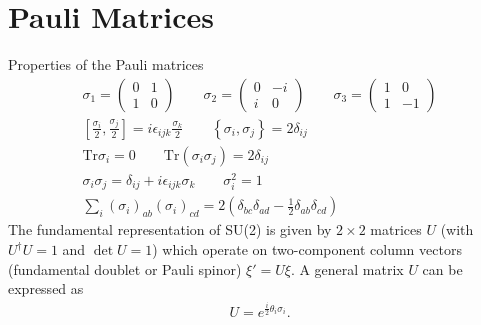 \documentclass[10pt,a4paper]{book}
\theoremstyle{definition}
\begin{document}
\section{Pauli Matrices}
Properties of the Pauli matrices
\begin{align}
\sigma_1=\left(
\begin{matrix}
0    & 1\\
1 &  0
\end{matrix}
\right)\qquad
\sigma_2=\left(
\begin{matrix}
0    & -i\\
i &  0
\end{matrix}
\right)\qquad
\sigma_3=
\left(
\begin{matrix}
1 & 0\\
1 &  -1
\end{matrix}
\right)\\
%
\left[\frac{\sigma_i}{2},\frac{\sigma_j}{2}\right]=i\epsilon_{ijk}\frac{\sigma_k}{2}\qquad\left\{\sigma_i,\sigma_j\right\}=2\delta_{ij}\\
\mathrm{Tr}\sigma_i=0\qquad\mathrm{Tr}(\sigma_i\sigma_j)=2\delta_{ij}\\
\sigma_i\sigma_j=\delta_{ij}+i\epsilon_{ijk}\sigma_k\qquad\sigma_i^2=1\\
\sum_i(\sigma_i)_{ab}(\sigma_i)_{cd}=2(\delta_{bc}\delta_{ad}-\frac{1}{2}\delta_{ab}\delta_{cd})
\end{align}
The fundamental representation of SU(2) is given by $2\times2$ matrices $U$ (with $U^\dagger U=1$ and $\det U=1$) which operate on two-component column vectors (fundamental doublet or Pauli spinor) $\xi'=U\xi$. A general matrix $U$ can be expressed as
\begin{align}
U=e^{\frac{i}{2}\theta_i\sigma_i}.
\end{align}
\end{document}
